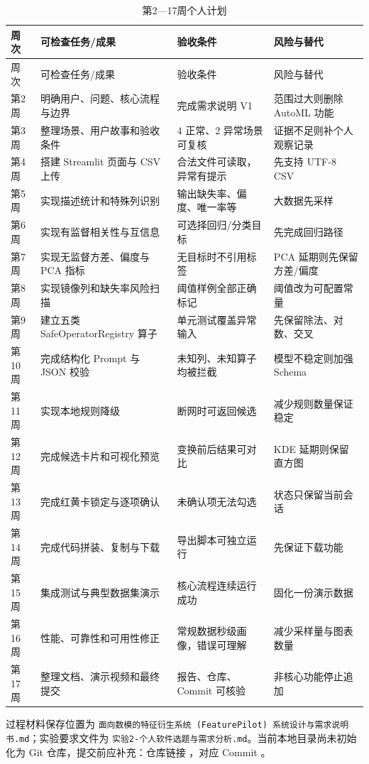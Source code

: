 \documentclass[UTF8,12pt,a4paper]{ctexart}
\begin{document}
{\small
\begin{longtable}{p{2.2cm}p{5.7cm}p{4.3cm}p{2.3cm}}
\caption{第2—17周个人计划}\label{tab:plan}\\
\toprule
周次 & 可检查任务/成果 & 验收条件 & 风险与替代 \\
\midrule
\endfirsthead
\toprule
周次 & 可检查任务/成果 & 验收条件 & 风险与替代 \\
\midrule
\endhead
第2周 & 明确用户、问题、核心流程与边界 & 完成需求说明 V1 & 范围过大则删除 AutoML 功能 \\
第3周 & 整理场景、用户故事和验收条件 & 4 正常、2 异常场景可复核 & 证据不足则补个人观察记录 \\
第4周 & 搭建 Streamlit 页面与 CSV 上传 & 合法文件可读取，异常有提示 & 先支持 UTF-8 CSV \\
第5周 & 实现描述统计和特殊列识别 & 输出缺失率、偏度、唯一率等 & 大数据先采样 \\
第6周 & 实现有监督相关性与互信息 & 可选择回归/分类目标 & 先完成回归路径 \\
第7周 & 实现无监督方差、偏度与 PCA 指标 & 无目标时不引用标签 & PCA 延期则先保留方差/偏度 \\
第8周 & 实现镜像列和缺失率风险扫描 & 阈值样例全部正确标记 & 阈值改为可配置常量 \\
第9周 & 建立五类 SafeOperatorRegistry 算子 & 单元测试覆盖异常输入 & 先保留除法、对数、交叉 \\
第10周 & 完成结构化 Prompt 与 JSON 校验 & 未知列、未知算子均被拦截 & 模型不稳定则加强 Schema \\
第11周 & 实现本地规则降级 & 断网时可返回候选 & 减少规则数量保证稳定 \\
第12周 & 完成候选卡片和可视化预览 & 变换前后结果可对比 & KDE 延期则保留直方图 \\
第13周 & 完成红黄卡锁定与逐项确认 & 未确认项无法勾选 & 状态只保留当前会话 \\
第14周 & 完成代码拼装、复制与下载 & 导出脚本可独立运行 & 先保证下载功能 \\
第15周 & 集成测试与典型数据集演示 & 核心流程连续运行成功 & 固化一份演示数据 \\
第16周 & 性能、可靠性和可用性修正 & 常规数据秒级画像，错误可理解 & 减少采样量与图表数量 \\
第17周 & 整理文档、演示视频和最终提交 & 报告、仓库、Commit 可核验 & 非核心功能停止追加 \\
\bottomrule
\end{longtable}
}

过程材料保存位置为 \texttt{面向数模的特征衍生系统 (FeaturePilot) 系统设计与需求说明书.md}；实验要求文件为 \texttt{实验2-个人软件选题与需求分析.md}。当前本地目录尚未初始化为 Git 仓库，提交前应补充：仓库链接 \underline{\hspace{5cm}}，对应 Commit \underline{\hspace{4cm}}。
\end{document}
